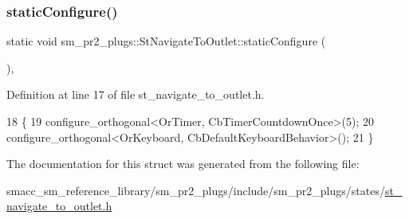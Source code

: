 \subsubsection{\texorpdfstring{static\+Configure()}{staticConfigure()}}
{\footnotesize\ttfamily static void sm\+\_\+pr2\+\_\+plugs\+::\+St\+Navigate\+To\+Outlet\+::static\+Configure (\begin{DoxyParamCaption}{ }\end{DoxyParamCaption})\hspace{0.3cm}{\ttfamily [inline]}, {\ttfamily [static]}}



Definition at line 17 of file st\+\_\+navigate\+\_\+to\+\_\+outlet.\+h.


\begin{DoxyCode}
18     \{
19         configure\_orthogonal<OrTimer, CbTimerCountdownOnce>(5);   
20         configure\_orthogonal<OrKeyboard, CbDefaultKeyboardBehavior>();
21     \}
\end{DoxyCode}


The documentation for this struct was generated from the following file\+:\begin{DoxyCompactItemize}
\item 
smacc\+\_\+sm\+\_\+reference\+\_\+library/sm\+\_\+pr2\+\_\+plugs/include/sm\+\_\+pr2\+\_\+plugs/states/\hyperlink{st__navigate__to__outlet_8h}{st\+\_\+navigate\+\_\+to\+\_\+outlet.\+h}\end{DoxyCompactItemize}
